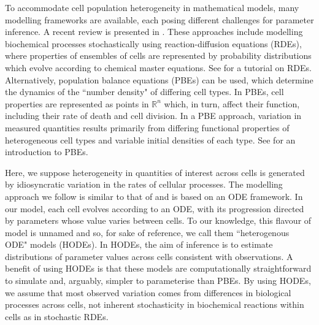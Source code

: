To accommodate cell population heterogeneity in mathematical models, many modelling frameworks are available, each posing different challenges for parameter inference. A recent review is presented in \cite{waldherr2018estimation}. These approaches include modelling biochemical processes stochastically using reaction-diffusion equations (RDEs), where properties of ensembles of cells are represented by probability distributions which evolve according to chemical master equations. See \cite{erban2007practical} for a tutorial on RDEs. Alternatively, population balance equations (PBEs) can be used, which determine the dynamics of the ``number density" of differing cell types. In PBEs, cell properties are represented as points in $\mathbb{R}^n$ which, in turn, affect their function, including their rate of death and cell division. In a PBE approach, variation in measured quantities results primarily from differing functional properties of heterogeneous cell types and variable initial densities of each type. See \cite{ramkrishna2014population} for an introduction to PBEs.

Here, we suppose heterogeneity in quantities of interest across cells is generated by idiosyncratic variation in the rates of cellular processes. The modelling approach we follow is similar to that of \cite{dixit2018maximum} and is based on an ODE framework. In our model, each cell evolves according to an ODE, with its progression directed by parameters whose value varies between cells. To our knowledge, this flavour of model is unnamed and so, for sake of reference, we call them ``heterogenous ODE" models (HODEs). In HODEs, the aim of inference is to estimate distributions of parameter values across cells consistent with observations. A benefit of using HODEs is that these models are computationally straightforward to simulate and, arguably, simpler to parameterise than PBEs. By using HODEs, we assume that most observed variation comes from differences in biological processes across cells, not inherent stochasticity in biochemical reactions within cells as in stochastic RDEs.

